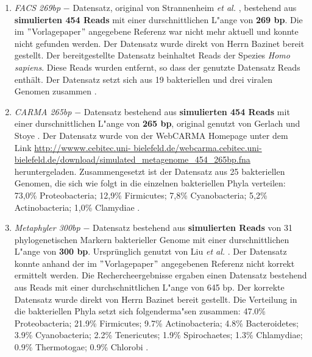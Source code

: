 \documentclass[10pt, a4paper]{report}[08.12.2015]
\begin{document}
        \begin{enumerate}
        
          \item \textit{FACS 269bp} $-$ Datensatz, original von Strannenheim 			  \textit{et al.} \cite{stranneheim2010}, bestehend aus
          \textbf{ simulierten 454 
          Reads} mit einer durschnittlichen L"ange von \textbf{269 bp}. Die
          im $"$Vorlagepaper$"$ angegebene Referenz war nicht mehr aktuell 				  und konnte nicht gefunden werden. Der Datensatz wurde direkt von 				  Herrn Bazinet bereit gestellt. Der bereitgestellte Datensatz 					  beinhaltet  Reads der Spezies \textit{Homo sapiens}. Diese 				  Reads wurden entfernt, so dass der genutzte Datensatz  Reads 			  enth\"alt. Der Datensatz setzt sich aus 19 bakteriellen und drei 				  viralen Genomen zusammen \cite{bazinet2012}.  
           
          \item \textit{CARMA 265bp} $-$ Datensatz bestehend aus
          \textbf{ simulierten 454 Reads} mit einer durschnittlichen 				  L"ange von \textbf{265 bp}, original genutzt von Gerlach und Stoye
          \cite{GerlachStoye2011}. Der Datensatz wurde von der WebCARMA 				  Homepage unter dem Link \url{http://wwww.cebitec.uni-							  bielefeld.de/webcarma.cebitec.uni-											  bielefeld.de/download/simulated_metagenome_454_265bp.fna}
          heruntergeladen. Zusammengesetzt ist der Datensatz aus 25 				 	  bakteriellen Genomen, die sich wie folgt in die einzelnen 					  bakteriellen Phyla verteilen: 73,0\% Proteobacteria; 12,9\% 					  Firmicutes; 7,8\% Cyanobacteria; 5,2\% Actinobacteria; 1,0\% 					  Clamydiae \cite{bazinet2012}.
          
          \item \textit{Metaphyler 300bp} $-$ Datensatz bestehend aus 
          \textbf{ simulierten
          Reads} von 31 phylogenetischen Markern bakterieller Genome mit 			  	  einer durschnittlichen L"ange von \textbf{300 bp}. Urspr\"unglich 			  genutzt von Liu \textit{et al.} \cite{Liu2010}. Der
          Datensatz konnte anhand der im $"$Vorlagepaper$"$ angegebenen 				  Referenz nicht korrekt ermittelt werden. Die Rechercheergebnisse
          ergaben einen Datensatz bestehend aus  Reads mit einer 
          durchschnittlichen L"ange von 645 bp. Der korrekte
          Datensatz wurde direkt von Herrn Bazinet bereit gestellt. 
          Die Verteilung in die bakteriellen Phyla setzt sich folgenderma"sen 		  zusammen: 47.0\% Proteobacteria; 21.9\% Firmicutes; 9.7\% 					  Actinobacteria; 4.8\% Bacteroidetes; 3.9\% Cyanobacteria; 2.2\% 				  Tenericutes; 1.9\% Spirochaetes; 1.3\% Chlamydiae; 0.9\% 						  Thermotogae; 0.9\% Chlorobi \cite{bazinet2012}. 
          

\end{enumerate}
\end{document}
